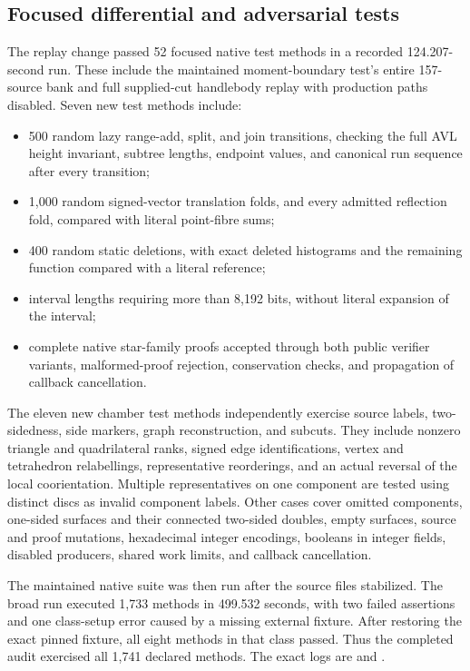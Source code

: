 \subsection{Focused differential and adversarial tests}

The replay change passed 52 focused native test methods in a recorded
124.207-second run. These include the maintained moment-boundary test's
entire 157-source bank and full supplied-cut handlebody replay with
production paths disabled. Seven new test methods include:

\begin{itemize}
\item 500 random lazy range-add, split, and join transitions, checking the
full AVL height invariant, subtree lengths, endpoint values, and canonical
run sequence after every transition;
\item 1,000 random signed-vector translation folds, and every admitted
reflection fold, compared with literal point-fibre sums;
\item 400 random static deletions, with exact deleted histograms and the
remaining function compared with a literal reference;
\item interval lengths requiring more than 8,192 bits, without literal
expansion of the interval;
\item complete native star-family proofs accepted through both public
verifier variants, malformed-proof rejection, conservation checks, and
propagation of callback cancellation.
\end{itemize}

The eleven new chamber test methods independently exercise source labels,
two-sidedness, side markers, graph reconstruction, and subcuts. They include
nonzero triangle and quadrilateral ranks, signed edge identifications,
vertex and tetrahedron relabellings, representative reorderings, and an
actual reversal of the local coorientation. Multiple representatives on
one component are tested using distinct discs as invalid component labels.
Other cases cover omitted components, one-sided surfaces and their
connected two-sided doubles, empty surfaces, source and proof mutations,
hexadecimal integer encodings, booleans in integer fields, disabled
producers, shared work limits, and callback cancellation.

The maintained native suite was then run after the source files stabilized.
The broad run executed 1,733 methods in 499.532 seconds, with two failed
assertions and one class-setup error caused by a missing external fixture.
After restoring the exact pinned fixture, all eight methods in that class
passed. Thus the completed audit exercised all 1,741 declared methods.
The exact logs are  and
.

